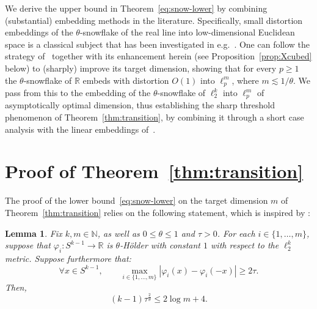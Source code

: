 \documentclass[11pt,reqno]{amsart}
\newtheorem{lemma}[theorem]{Lemma}
\newcommand{\R}{\mathbb{R}}
\newcommand{\N}{\mathbb{N}}
\renewcommand{\le}{\leqslant}
\renewcommand{\ge}{\geqslant}
\newcommand{\abs}[1]{\left\lvert #1 \right\rvert}
\newcommand{\1}{\mathbf{1}}
\begin{document}
We derive the  upper bound in Theorem~\ref{eq:snow-lower} by combining (substantial) embedding methods in the literature. Specifically, small distortion embeddings of the $\theta$-snowflake of the real line into low-dimensional Euclidean space is a classical subject that has been  investigated in e.g.~\cite{Gla58,Kahane,Assouad,Talagrand,DH99,HM12}. One can follow the strategy of~\cite{Assouad}  together with its enhancement herein (see Proposition~\ref{prop:Xcubed} below) to (sharply) improve its target dimension, showing  that for every $p\ge 1$ the $\theta$-snowflake of $\R$ embeds with distortion $O(1)$ into $\ell_p^m$, where $m\lesssim 1/\theta$.  We pass from this to the embedding of the $\theta$-snowflake of $\ell_2^k$ into $\ell_p^m$ of asymptotically optimal  dimension, thus establishing the sharp threshold phenomenon of Theorem~\ref{thm:transition}, by combining it through a short case analysis with the linear embeddings of~\cite{FLM,Kas77,Vyb08,FPRU10}.

\section{Proof of Theorem~\ref{thm:transition}}\label{sec:lower}

The proof of the lower bound~\eqref{eq:snow-lower} on  the target dimension $m$ of Theorem~\ref{thm:transition} relies on the following statement, 
which is inspired by \cite[Proposition~4.2]{LMN}:
\begin{lemma}\label{prop:engine} Fix $k,m\in \N$, as well as $0\le \theta\le 1$ and $\tau>0$. For each $i\in \{1,\ldots,m\}$, suppose that $\varphi_i : S^{k-1} \to \R$ is $\theta$-H\"older with constant $1$ with respect to the $\ell_2^k$ metric.   Suppose furthermore that:
\begin{equation}\label{eq:antipodal}
  \forall x\in S^{k-1},\qquad   \max_{i\in \{1,\ldots,m\}}\abs{\varphi_i(x)-\varphi_i(-x)}\ge2\tau.
\end{equation}
Then,
\begin{equation}\label{eq:use concentration}
(k-1)\tau^{\frac{2}{\theta}}\le 2\log m+4.
\end{equation}
\end{lemma}
\end{document}
